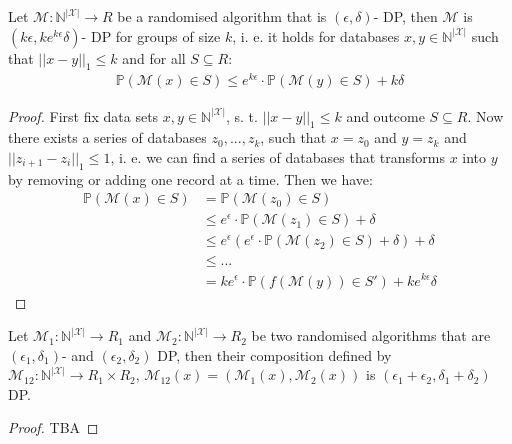 \begin{thm}
    Let $\mathcal{M}: \mathbb{N}^{|\mathcal{X}|} \rightarrow R$ be a randomised algorithm that is $(\epsilon, \delta)$- DP, then $\mathcal{M}$ is $(k\epsilon, k e^{k\epsilon} \delta)$- DP for groups of size $k$, i. e. it holds for databases $x,y \in \mathbb{N}^{|\mathcal{X}|}$ such that $||x-y||_1\le k$ and for all $S \subseteq R$:
    \begin{align}
        \mathbb{P}(\mathcal{M}(x) \in S) \le e^{k\epsilon} \cdot \mathbb{P}(\mathcal{M}(y) \in S) + k\delta 
    \end{align}
\end{thm}
\begin{proof}
    First fix data sets $x,y \in \mathbb{N}^{|\mathcal{X}|}$, s. t. $||x-y||_1\le k$ and outcome $S \subseteq R$. Now there exists a series of databases $z_0,..., z_k$, such that $x=z_0$ and $y=z_k$ and $|| z_{i+1} - z_i||_1 \le 1$, i. e. we can find a series of databases that transforms $x$ into $y$ by removing or adding one record at a time. Then we have:
    \begin{align}
        \mathbb{P}(\mathcal{M}(x)\in S) &= \mathbb{P}(\mathcal{M}(z_0)\in S) \nonumber \\
        &\le e^\epsilon \cdot \mathbb{P}(\mathcal{M}(z_1)\in S) + \delta \nonumber \\
        &\le e^\epsilon \left( e^\epsilon \cdot \mathbb{P}(\mathcal{M}(z_2)\in S) + \delta \right) + \delta \nonumber \\
        &\le ... \nonumber \\
        &= k e^\epsilon \cdot \mathbb{P}(f(\mathcal{M}(y))\in S') + k e^{k \epsilon} \delta
    \end{align}
\end{proof}

\begin{thm}
    Let $\mathcal{M}_1: \mathbb{N}^{|\mathcal{X}|} \rightarrow R_1$ and $\mathcal{M}_2: \mathbb{N}^{|\mathcal{X}|} \rightarrow R_2$ be two randomised algorithms that are $(\epsilon_1, \delta_1)$- and $(\epsilon_2, \delta_2)$ DP, then their composition defined by $\mathcal{M}_{12}: \mathbb{N}^{|\mathcal{X}|} \rightarrow R_1 \times R_2$, $\mathcal{M}_{12}(x)=(\mathcal{M}_{1}(x), \mathcal{M}_{2}(x))$ is $(\epsilon_1+\epsilon_2, \delta_1+\delta_2)$ DP.
\end{thm}
\begin{proof}
    TBA
\end{proof}

